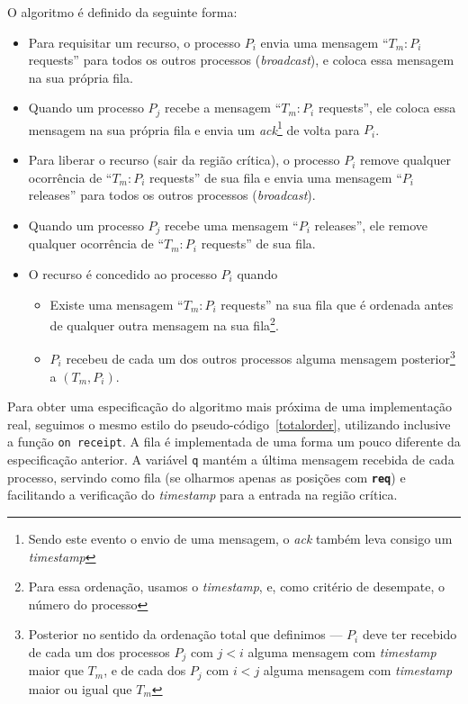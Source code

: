 O algoritmo é definido da seguinte forma:
\begin{itemize}
\item Para requisitar um recurso, o processo $P_i$ envia uma mensagem
  ``$T_m:P_i$ requests'' para todos os outros processos
  (\emph{broadcast}), e coloca essa mensagem na sua própria fila.
\item Quando um processo $P_j$ recebe a mensagem ``$T_m:P_i$ requests'',
  ele coloca essa mensagem na sua própria fila e envia um
  \emph{ack}\footnote{Sendo este evento o envio de uma mensagem, o
  \emph{ack} também leva consigo um \emph{timestamp}} de volta para
  $P_i$.
\item Para liberar o recurso (sair da região crítica), o processo $P_i$
  remove qualquer ocorrência de ``$T_m:P_i$ requests'' de sua fila e
  envia uma mensagem ``$P_i$ releases'' para todos os outros processos
  (\emph{broadcast}).
\item Quando um processo $P_j$ recebe uma mensagem ``$P_i$ releases'',
  ele remove qualquer ocorrência de ``$T_m:P_i$ requests'' de sua fila.
\item O recurso é concedido ao processo $P_i$ quando
\begin{itemize}
 \item Existe uma mensagem ``$T_m:P_i$ requests'' na sua fila que é
   ordenada antes de qualquer outra mensagem na sua fila\footnote{Para
   essa ordenação, usamos o \emph{timestamp}, e, como critério de
   desempate, o número do processo}.
\item $P_i$ recebeu de cada um dos outros processos alguma mensagem
  posterior\footnote{Posterior no sentido da ordenação
    total que definimos --- $P_i$ deve ter recebido de cada um dos
    processos $P_j$ com $j < i$ alguma mensagem com \emph{timestamp}
    maior que $T_m$, e de cada dos $P_j$ com $i < j$ alguma mensagem
    com \emph{timestamp} maior ou igual que $T_m$} a $(T_m,P_i)$.
\end{itemize}
\end{itemize}

Para obter uma especificação do algoritmo mais próxima de uma
implementação real, seguimos o mesmo estilo do
pseudo-código~\ref{totalorder}, utilizando inclusive a função
\texttt{on receipt}. A fila é implementada de uma forma um pouco
diferente da especificação anterior. A variável \texttt{q} mantém a
última mensagem recebida de cada processo, servindo como fila (se
olharmos apenas as posições com \texttt{\textbf{req}}) e facilitando a
verificação do \emph{timestamp} para a entrada na região crítica.

